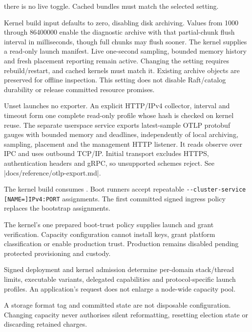 \begin{description}
        there is no live toggle. Cached bundles must match the selected setting.
    \item[Diagnostic telemetry archive.] Kernel build input
         defaults to zero, disabling
        disk archiving. Values from 1000 through 86400000 enable the diagnostic
        archive with that partial-chunk flush interval in milliseconds, though full
        chunks may flush sooner. The kernel supplies a read-only launch
        manifest. Live one-second sampling, bounded memory history and fresh
        placement reporting remain active. Changing the setting requires
        rebuild/restart, and cached kernels must match it. Existing archive objects
        are preserved for offline inspection. This setting does not disable
        Raft/catalog durability or release committed resource promises.
    \item[Native telemetry export.] Unset  launches
        no exporter. An explicit HTTP/IPv4 collector, interval and timeout form
        one complete read-only profile whose hash is checked on kernel reuse.
        The separate userspace service exports latest-sample OTLP protobuf
        gauges with bounded memory and deadlines, independently of local
        archiving, sampling, placement and the management HTTP listener.
        It reads observe over IPC and uses outbound TCP/IP. Initial transport excludes
        HTTPS, authentication headers and gRPC, so unsupported schemes reject.
        See \repofile|docs/reference/otlp-export.md|.
    \item[Bootstrap assignments.] The kernel build consumes
        . Boot runners accept repeatable
        \texttt{-{}-cluster-service [NAME=]IPv4:PORT} assignments. The first
        committed signed ingress policy replaces the bootstrap assignments.
    \item[Trust policy.] The kernel's one prepared boot-trust policy supplies
        launch and grant verification. Capacity configuration cannot install
        keys, grant platform classification or enable production trust.
        Production remains disabled pending protected provisioning and custody.
    \item[Application launch policy.] Signed deployment and kernel admission
        determine per-domain stack/thread limits, executable variants,
        delegated capabilities and protocol-specific launch profiles. An
        application's request does not enlarge a node-wide capacity pool.
    \item[Persistent state.] A storage format tag and committed state are not
        disposable configuration. Changing capacity never authorises silent
        reformatting, resetting election state or discarding retained charges.
\end{description}

